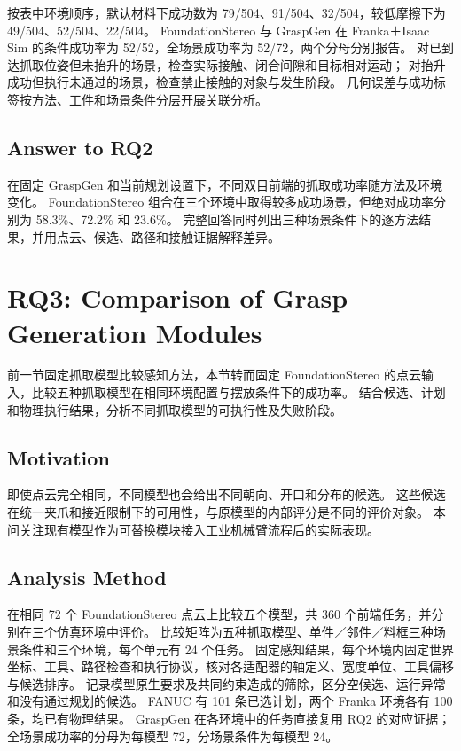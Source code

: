 \documentclass[UTF8,fontset=fandol,a4paper,11pt]{ctexart}
\newcommand{\qyb}[1]{\textcolor{red!75!black}{#1}}
\begin{document}
按表中环境顺序，默认材料下成功数为 79/504、91/504、32/504，较低摩擦下为 49/504、52/504、22/504。
FoundationStereo 与 GraspGen 在 Franka＋Isaac Sim 的条件成功率为 52/52，全场景成功率为 52/72，两个分母分别报告。
对已到达抓取位姿但未抬升的场景，检查实际接触、闭合间隙和目标相对运动；
对抬升成功但执行未通过的场景，检查禁止接触的对象与发生阶段。
几何误差与成功标签按方法、工件和场景条件分层开展关联分析。

\subsection{\qyb{Answer to RQ2}}

在固定 GraspGen 和当前规划设置下，不同双目前端的抓取成功率随方法及环境变化。
FoundationStereo 组合在三个环境中取得较多成功场景，但绝对成功率分别为 58.3\%、72.2\% 和 23.6\%。
完整回答同时列出三种场景条件下的逐方法结果，并用点云、候选、路径和接触证据解释差异。

\section{\qyb{RQ3: Comparison of Grasp Generation Modules}}
\label{sec:rq3}

前一节固定抓取模型比较感知方法，本节转而固定 FoundationStereo 的点云输入，比较五种抓取模型在相同环境配置与摆放条件下的成功率。
结合候选、计划和物理执行结果，分析不同抓取模型的可执行性及失败阶段。

\subsection{\qyb{Motivation}}

即使点云完全相同，不同模型也会给出不同朝向、开口和分布的候选。
这些候选在统一夹爪和接近限制下的可用性，与原模型的内部评分是不同的评价对象。
本问关注现有模型作为可替换模块接入工业机械臂流程后的实际表现。

\subsection{\qyb{Analysis Method}}

在相同 72 个 FoundationStereo 点云上比较五个模型，共 360 个前端任务，并分别在三个仿真环境中评价。
比较矩阵为五种抓取模型、单件／邻件／料框三种场景条件和三个环境，每个单元有 24 个任务。
固定感知结果，每个环境内固定世界坐标、工具、路径检查和执行协议，核对各适配器的轴定义、宽度单位、工具偏移与候选排序。
记录模型原生要求及共同约束造成的筛除，区分空候选、运行异常和没有通过规划的候选。
FANUC 有 101 条已选计划，两个 Franka 环境各有 100 条，均已有物理结果。
GraspGen 在各环境中的任务直接复用 RQ2 的对应证据；全场景成功率的分母为每模型 72，分场景条件为每模型 24。
\end{document}
